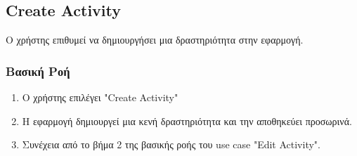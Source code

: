 
\subsection{Create Activity}

Ο χρήστης επιθυμεί να δημιουργήσει μια δραστηριότητα στην εφαρμογή.

\subsubsection{Βασική Ροή}

\begin{enumerate}
    \item Ο χρήστης επιλέγει "Create Activity"
    \item Η εφαρμογή δημιουργεί μια κενή δραστηριότητα και την αποθηκεύει
          προσωρινά.
    \item Συνέχεια από το βήμα 2 της βασικής ροής του use case "Edit Activity".
\end{enumerate}
